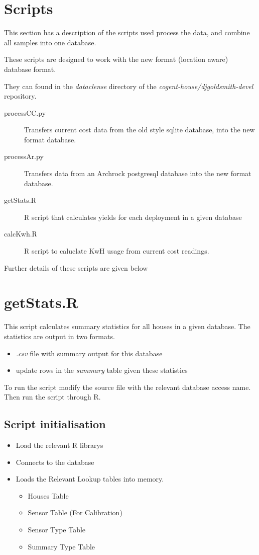 \documentclass[10pt,a4paper]{article}
\begin{document}
\section{Scripts}
This section has a description of the scripts used process the data, and combine
all samples into one database.

These scripts are designed to work with the new format (location aware) database format.

They can found in the \emph{dataclense} directory of the \emph{cogent-house/djgoldsmith-devel} repository.

\begin{description}
    \item[processCC.py]  Transfers current cost data from the old style sqlite
      database, into the new format database.
    \item[processAr.py] Transfers data from an Archrock postgresql database into the
      new format database.
    \item[getStats.R] R script that calculates yields for each deployment in a given database
    \item[calcKwh.R] R script to caluclate KwH usage from current cost readings.
\end{description}

Further details of these scripts are given below

\section{getStats.R}

This script calculates summary statistics for all houses in a given database.
The statistics are output in two formats.
\begin{itemize}
  \item \emph{.csv} file with summary output for this database
  \item update rows in the \emph{summary} table given these statistics
\end{itemize}

To run the script modify the source file with the relevant database access
name. Then run the script through R. 


\subsection{Script initialisation}

\begin{itemize}
\item Load the relevant R librarys
\item Connects to the database
\item Loads the Relevant Lookup tables into memory.
  \begin{itemize}
  \item Houses Table
  \item Sensor Table (For Calibration)
  \item Sensor Type Table
  \item Summary Type Table
  \end{itemize}
\end{itemize}
\end{document}
